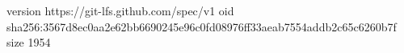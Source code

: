 version https://git-lfs.github.com/spec/v1
oid sha256:3567d8ec0aa2e62bb6690245e96c0fd08976ff33aeab7554addb2c65c6260b7f
size 1954
